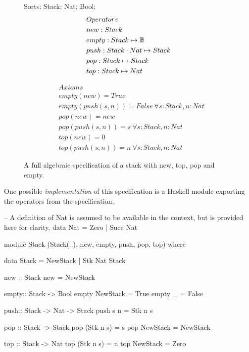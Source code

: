 \begin{figure*}
\begin{minipage}[t]{.3\linewidth}
Sorts: Stack; Nat; Bool;
\begin{align*}
& Operators \\
& new : Stack \\
& empty : Stack \mapsto \mathbb{B} \\
& push : Stack \cdot Nat \mapsto Stack \\
& pop : Stack \mapsto Stack\\
& top : Stack \mapsto Nat
\end{align*}
\end{minipage}
\begin{minipage}[t]{.1\linewidth}
\end{minipage}
\begin{minipage}[t]{.6\linewidth}
\begin{align*}
& Axioms \\
& empty( new ) = True \\
&empty ( push( s, n ) ) = False\  \forall s:Stack, n:Nat\\
& pop( new ) = new \\
& pop( push( s, n ) ) = s \  \forall s:Stack, n:Nat\\
& top( new ) = 0 \\
& top ( push( s, n ) ) = n\  \forall s:Stack, n:Nat
\end{align*}
\end{minipage}
\caption[Algebraic specification of a stack]
{A full algebraic specification of a stack with new, top, pop and empty.}
\label{full_list_spec_ex}
\end{figure*}

One possible \emph{implementation} of this specification 
is a Haskell module exporting the operators from the specification.

\begin{code}
-- A definition of Nat is assumed to be available in the context, but is provided here for clarity.
data Nat = Zero | Succ Nat 

module Stack (Stack(..), new, empty, push, pop, top) where

data Stack = NewStack | Stk Nat Stack 

new :: Stack
new = NewStack

empty:: Stack -> Bool
empty NewStack = True
empty _ = False

push:: Stack -> Nat -> Stack
push s n = Stk n s

pop ::  Stack -> Stack
pop (Stk n s) = s
pop NewStack = NewStack

top :: Stack -> Nat
top (Stk n s) = n
top NewStack = Zero

\end{code}


